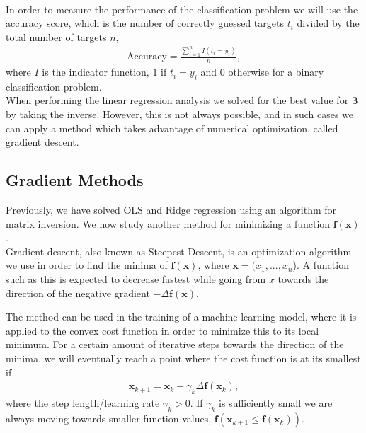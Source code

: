 \documentclass[english,notitlepage,reprint,nofootinbib]{revtex4-2}  %
\begin{document}
\vspace{3mm}
\\ 
In order to measure the performance of the classification problem we will use the accuracy score, which is the number of correctly guessed targets $t_i$ divided by the total number of targets $n$, 
\begin{align}
    \text{Accuracy} = \frac{\sum_{i=1}^n I(t_i = y_i)}{n}, 
\end{align}
where $I$ is the indicator function, $1$ if $t_i = y_i$ and $0$ otherwise for a binary classification problem. 
\vspace{3mm}
\\ 
When performing the linear regression analysis we solved for the best value for $\boldsymbol{\beta}$ by taking the inverse. However, this is not always possible, and in such cases we can apply a method which takes advantage of numerical optimization, called gradient descent. 

\subsection*{Gradient Methods}
Previously, we have solved OLS and Ridge regression using an algorithm for matrix inversion. 
We now study another method for minimizing a function $\boldsymbol{f}(\boldsymbol{x})$. 
\vspace{3mm}
\\ 
Gradient descent, also known as Steepest Descent, is an optimization algorithm we use in order to find the minima of $\boldsymbol{f}(\boldsymbol{x})$, where $\boldsymbol{x} = (x_1, ..., x_n$). A function such as this is expected to decrease fastest while going from $x$ towards the direction of the negative gradient $-\Delta\boldsymbol{f}(\boldsymbol{x})$. 

The method can be used in the training of a machine learning model, where it is applied to the convex cost function in order to minimize this to its local minimum. 
For a certain amount of iterative steps towards the direction of the minima, we will eventually reach a point where the cost function is at its smallest if 
\begin{align}
    \boldsymbol{x}_{k+1} = \boldsymbol{x}_k - \gamma_k \Delta\boldsymbol{f}(\boldsymbol{x}_k), \nonumber 
\end{align}
where the step length/learning rate $\gamma_k > 0$. If $\gamma_k$ is sufficiently small we are always moving towards smaller function values, $\boldsymbol{f}(\boldsymbol{x}_{k+1} \leq \boldsymbol{f}(\boldsymbol{x}_k))$. 
\end{document}
